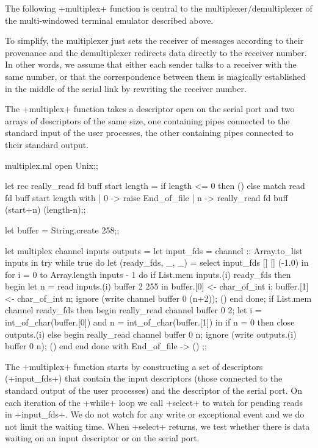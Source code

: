 \begin{example} 
The following \ml+multiplex+ function is central to the
multiplexer/demultiplexer of the multi-windowed terminal emulator
described above.

To simplify, the multiplexer just sets the receiver of messages
according to their provenance and the demultiplexer redirects data
directly to the receiver number. In other words, we assume that either
each sender talks to a receiver with the same number, or that the
correspondence between them is magically established in the middle of
the serial link by rewriting the receiver number.

The \ml+multiplex+ function takes a descriptor open on the serial port
and two arrays of descriptors of the same size, one containing pipes
connected to the standard input of the user processes, the other
containing pipes connected to their standard output.
%
\begin{listingcodefile}{multiplex.ml}
open Unix;;

let rec really_read fd buff start length =
  if length <= 0 then () else
    match read fd buff start length with
    | 0 -> raise End_of_file
    | n -> really_read fd buff (start+n) (length-n);;

let buffer = String.create 258;;

let multiplex channel inputs outputs =
  let input_fds = channel :: Array.to_list inputs in
  try
    while true do
      let (ready_fds, _, _) = select input_fds [] [] (-1.0) in
      for i = 0 to Array.length inputs - 1 do
        if List.mem inputs.(i) ready_fds then begin
          let n = read inputs.(i) buffer 2 255 in
          buffer.[0] <- char_of_int i;
          buffer.[1] <- char_of_int n;
          ignore (write channel buffer 0 (n+2));
          ()
        end
      done;
      if List.mem channel ready_fds then begin
        really_read channel buffer 0 2;
        let i = int_of_char(buffer.[0])
        and n = int_of_char(buffer.[1]) in
        if n = 0 then close outputs.(i) else 
        begin
          really_read channel buffer 0 n;
          ignore (write outputs.(i) buffer 0 n);
          ()
        end
      end
    done
  with End_of_file -> () ;;
\end{listingcodefile}

The \ml+multiplex+ function starts by constructing a set of
descriptors (\ml+input_fds+) that contain the input descriptors
(those connected to the standard output of the user processes) and the
descriptor of the serial port. On each iteration of the 
\ml+while+ loop we call \ml+select+ to watch for pending reads in
\ml+input_fds+. We do not watch for any write or exceptional event and
we do not limit the waiting time. When \ml+select+ returns, we test whether
there is data waiting on an input descriptor or on the serial port.


\end{example}
